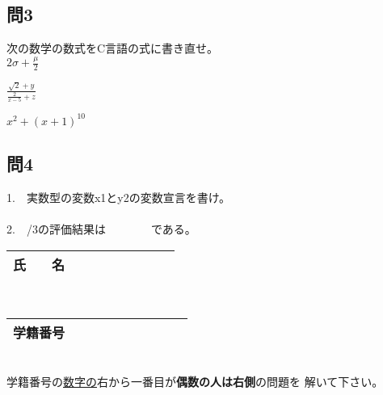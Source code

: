 \documentclass[a4j]{jarticle}
\begin{document}
\begin{multicols*}{2}
\subsection*{問3}
次の数学の数式をC言語の式に書き直せ。\\

$2\sigma+\frac{\mu}{2}$

$\frac{\sqrt{2}+y}{\frac{2}{x-5}+z}$

$x^2+(x+1)^{10}$



\subsection*{問4}


1.　実数型の変数{\ttfamily x1}と{\ttfamily y2}の変数宣言を書け。\\
\\

2.　{/3}の評価結果は　　　　である。




%




\vfill








\noindent
\begin{tabular}[t]{|c|cccccccc|}\hline
氏　　名 & & & & & & & & \\ \hline
\end{tabular}\\
\begin{tabular}[t]{|c|c|c|c|c|c|c|c|c|c|}\hline
学籍番号 & & & & & & & & \\ \hline
\end{tabular}\\
学籍番号の\underline{数字の}右から一番目が{\bfseries 偶数の人は右側}の問題を
解いて下さい。
\vspace{-5ex}





\end{multicols*}
\end{document}
